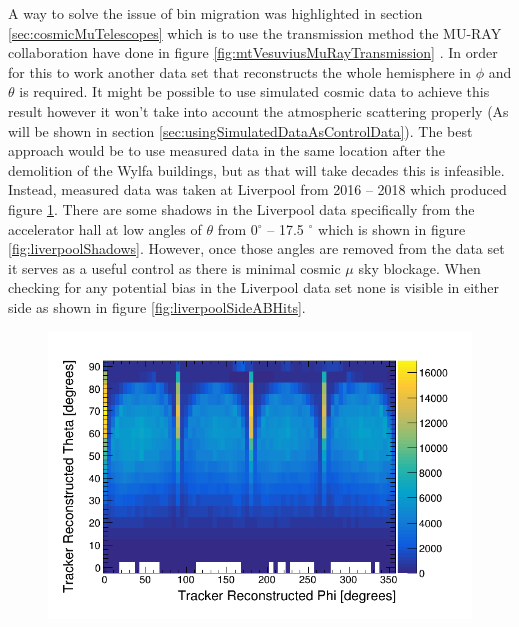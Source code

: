 A way to solve the issue of bin migration was highlighted in section \ref{sec:cosmicMuTelescopes} which is to use the transmission method the MU-RAY collaboration have done in figure \ref{fig:mtVesuviusMuRayTransmission} \cite{Ambrosino_2014}. In order for this to work  another data set that reconstructs the whole hemisphere in $\phi$ and $\theta$ is required. It might be possible to use simulated cosmic data to achieve this result however it won't take into account the atmospheric scattering properly (As will be shown in section \ref{sec:usingSimulatedDataAsControlData}). The best approach would be to use measured data in the same location after the demolition of the Wylfa buildings, but as that will take decades this is infeasible. Instead, measured data was taken at Liverpool from 2016 -- 2018 which produced figure \ref{fig:pVsTLiverpoolReversed}. There are some shadows in the Liverpool data specifically from the accelerator hall at low angles of $\theta$ from 0$^\circ$ -- 17.5 $^\circ$ which is shown in figure \ref{fig:liverpoolShadows}. However, once those angles are removed from the data set it serves as a useful control as there is minimal cosmic $\mu$ sky blockage. When checking for any potential bias in the Liverpool data set none is visible in either side as shown in figure \ref{fig:liverpoolSideABHits}. 

\begin{figure}[!h]
 \centering
 \includegraphics[width=0.7\linewidth]{Chapter5/Figs/Raster/pVsTLiverpoolReversed.png}
 \label{fig:pVsTLiverpoolReversed}
\end{figure}

